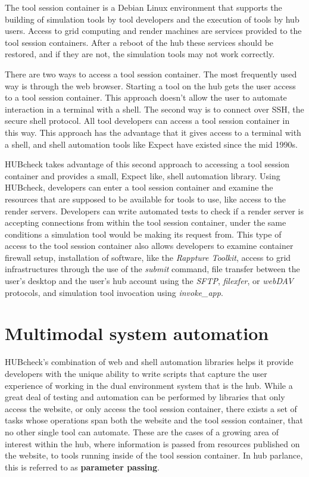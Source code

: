 \documentclass[letterpaper]{scrartcl}
\begin{document}
The tool session container is a Debian Linux environment that supports the
building of simulation tools by tool developers and the execution of tools by
hub users. Access to grid computing and render machines are services provided
to the tool session containers. After a reboot of the hub these services should
be restored, and if they are not, the simulation tools may not work correctly.

There are two ways to access a tool session container. The most frequently used
way is through the web browser. Starting a tool on the hub gets the user access
to a tool session container. This approach doesn't allow the user to automate
interaction in a terminal with a shell. The second way is to connect over SSH,
the secure shell protocol. All tool developers can access a tool session
container in this way. This approach has the advantage that it gives access to
a terminal with a shell, and shell automation tools like Expect have existed
since the mid 1990s.

HUBcheck takes advantage of this second approach to accessing a tool session
container and provides a small, Expect like, shell automation library. Using
HUBcheck, developers can enter a tool session container and examine the
resources that are supposed to be available for tools to use, like access to
the render servers. Developers can write automated tests to check if a render
server is accepting connections from within the tool session container, under
the same conditions a simulation tool would be making its request from. This
type of access to the tool session container also allows developers to examine
container firewall setup, installation of software, like the \textit{Rappture
Toolkit}, access to grid infrastructures through the use of the \textit{submit}
command, file transfer between the user's desktop and the user's hub account
using the \textit{SFTP}, \textit{filexfer}, or \textit{webDAV} protocols, and
simulation tool invocation using \textit{invoke\_app}.


\section{Multimodal system automation}


HUBcheck's combination of web and shell automation libraries helps it provide
developers with the unique ability to write scripts that capture the user
experience of working in the dual environment system that is the hub. While a
great deal of testing and automation can be performed by libraries that only
access the website, or only access the tool session container, there exists a
set of tasks whose operations span both the website and the tool session
container, that no other single tool can automate. These are the cases of a
growing area of interest within the hub, where information is passed from
resources published on the website, to tools running inside of the tool session
container. In hub parlance, this is referred to as \textbf{parameter passing}.
\end{document}
